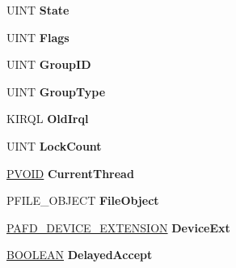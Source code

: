 \begin{DoxyCompactItemize}
\item 
\mbox{\label{struct___a_f_d___f_c_b_aa5ecc2245afc9cd52cee68fc95e38660}} 
U\+I\+NT {\bfseries State}
\item 
\mbox{\label{struct___a_f_d___f_c_b_aff2de543f1ee98339bd19b4f63d90d44}} 
U\+I\+NT {\bfseries Flags}
\item 
\mbox{\label{struct___a_f_d___f_c_b_a83d8ef1c80ec097c6fe77c0977a3156e}} 
U\+I\+NT {\bfseries Group\+ID}
\item 
\mbox{\label{struct___a_f_d___f_c_b_a1e0f96c5cbdf5afac4086020dda27728}} 
U\+I\+NT {\bfseries Group\+Type}
\item 
\mbox{\label{struct___a_f_d___f_c_b_a57c55b9547a73cb6d566a0c6ae2690d8}} 
K\+I\+R\+QL {\bfseries Old\+Irql}
\item 
\mbox{\label{struct___a_f_d___f_c_b_a05eeb966bea00098a86dd711c087f19a}} 
U\+I\+NT {\bfseries Lock\+Count}
\item 
\mbox{\label{struct___a_f_d___f_c_b_a4506c0463420fd9a3e770cabfc9709ec}} 
\hyperlink{interfacevoid}{P\+V\+O\+ID} {\bfseries Current\+Thread}
\item 
\mbox{\label{struct___a_f_d___f_c_b_ad7792854bfd910fe71eff0d696990dfe}} 
P\+F\+I\+L\+E\+\_\+\+O\+B\+J\+E\+CT {\bfseries File\+Object}
\item 
\mbox{\label{struct___a_f_d___f_c_b_a76dda2a0630408e72cd0dade12f6d219}} 
\hyperlink{struct___a_f_d___d_e_v_i_c_e___e_x_t_e_n_s_i_o_n}{P\+A\+F\+D\+\_\+\+D\+E\+V\+I\+C\+E\+\_\+\+E\+X\+T\+E\+N\+S\+I\+ON} {\bfseries Device\+Ext}
\item 
\mbox{\label{struct___a_f_d___f_c_b_a3ae29a2caad895926c927451df6e490e}} 
\hyperlink{_processor_bind_8h_a112e3146cb38b6ee95e64d85842e380a}{B\+O\+O\+L\+E\+AN} {\bfseries Delayed\+Accept}
\item 
\mbox{\label{struct___a_f_d___f_c_b_a11455168dc7954dfc609dd2238d89994}} 

\end{DoxyCompactItemize}

